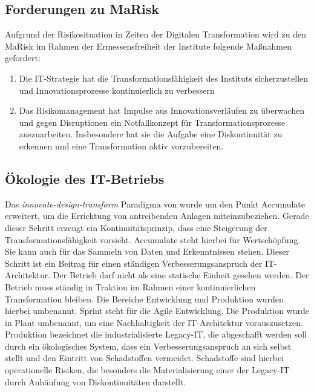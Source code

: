\subsection{Forderungen zu MaRisk}
Aufgrund der Risikosituation in Zeiten der Digitalen Transformation wird zu den \ac{MaRisk} \cite{MaRisk:2017} im Rahmen der Ermessensfreiheit der Institute folgende Maßnahmen gefordert:
\begin{enumerate}
    \item Die IT-Strategie hat die Transformationsfähigkeit des Instituts sicherzustellen und Innovationsprozesse kontinuierlich zu verbessern
    \item Das Risikomanagement hat Impulse aus Innovationsverläufen zu überwachen und gegen Disruptionen ein Notfallkonzept für Transformationsprozesse auszuarbeiten. Insbesondere hat sie die Aufgabe eine Diskontinuität zu erkennen und eine Transformation aktiv vorzubereiten. \cite{Fernandez:2020}
\end{enumerate}

\subsection{Ökologie des IT-Betriebs}
Das \emph{innovate-design-transform} Paradigma von \citet{Koch2016} wurde um den Punkt Accumulate erweitert, um die Errichtung von antreibenden Anlagen \cite{Ganswindt2006, Koch2016} miteinzubeziehen. Gerade dieser Schritt erzeugt ein Kontinuitätsprinzip, dass eine Steigerung der Transformationsfähigkeit vorsieht. Accumulate steht hierbei für Wertschöpfung. Sie kann auch für das Sammeln von Daten und Erkenntnissen stehen. Dieser Schritt ist ein Beitrag für einen ständigen Verbesserungsanspruch der IT-Architektur. Der Betrieb darf nicht als eine statische Einheit gesehen werden. Der Betrieb muss ständig in Traktion im Rahmen einer kontinuierlichen Transformation bleiben.
Die Bereiche Entwicklung und Produktion wurden hierbei umbenannt. Sprint steht für die Agile Entwicklung. Die Produktion wurde in Plant umbenannt, um eine Nachhaltigkeit der IT-Architektur vorauszusetzen. Produktion bezeichnet die industrialisierte Legacy-IT, die abgeschafft werden soll durch ein ökologisches System, dass ein Verbesserungsanspruch an sich selbst stellt und den Eintritt von Schadstoffen vermeidet. Schadstoffe sind hierbei operationelle Risiken, die besonders die Materialisierung einer der Legacy-IT durch Anhäufung von Diskontinuitäten darstellt.

